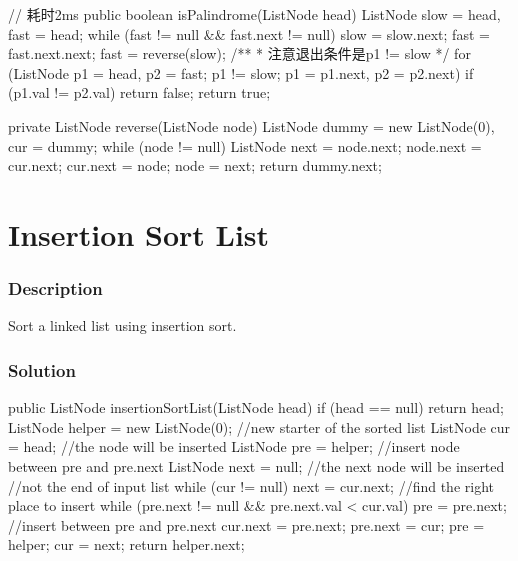 \begin{Code}
// 耗时2ms
public boolean isPalindrome(ListNode head) {
    ListNode slow = head, fast = head;
    while (fast != null && fast.next != null) {
        slow = slow.next;
        fast = fast.next.next;
    }
    fast = reverse(slow);
    /**
     * 注意退出条件是p1 != slow
     */
    for (ListNode p1 = head, p2 = fast; p1 != slow; p1 = p1.next, p2 = p2.next) {
        if (p1.val != p2.val) {
            return false;
        }
    }
    return true;
}

private ListNode reverse(ListNode node) {
    ListNode dummy = new ListNode(0), cur = dummy;
    while (node != null) {
        ListNode next = node.next;
        node.next = cur.next;
        cur.next = node;
        node = next;
    }
    return dummy.next;
}
\end{Code}

\newpage

\section{Insertion Sort List} %

\subsubsection{Description}
Sort a linked list using insertion sort.

\subsubsection{Solution}

\begin{Code}
public ListNode insertionSortList(ListNode head) {
    if (head == null) {
        return head;
    }
    ListNode helper = new ListNode(0); //new starter of the sorted list
    ListNode cur = head; //the node will be inserted
    ListNode pre = helper; //insert node between pre and pre.next
    ListNode next = null; //the next node will be inserted
    //not the end of input list
    while (cur != null) {
        next = cur.next;
        //find the right place to insert
        while (pre.next != null && pre.next.val < cur.val) {
            pre = pre.next;
        }
        //insert between pre and pre.next
        cur.next = pre.next;
        pre.next = cur;
        pre = helper;
        cur = next;
    }
    return helper.next;
}
\end{Code}

\newpage

